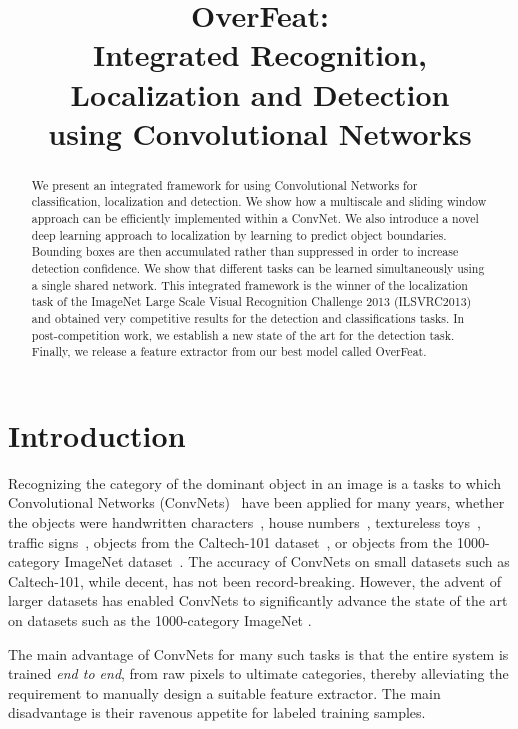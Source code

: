 \documentclass{article} %
\title{OverFeat:\\Integrated Recognition, Localization and Detection\\using Convolutional Networks}
\author{Pierre Sermanet
  \hskip 1em
  \textbf{David Eigen}\\
  \textbf{Xiang Zhang}
  \hskip 1em
  \textbf{Michael Mathieu}
  \hskip 1em
  \textbf{Rob Fergus}
  \hskip 1em
  \textbf{Yann LeCun}\\
Courant Institute of Mathematical Sciences, New York University\\
719 Broadway, 12th Floor, New York, NY 10003\\
\texttt{{sermanet,deigen,xiang,mathieu,fergus,yann}@cs.nyu.edu}
}
\begin{document}
\maketitle

\begin{abstract}
We present an integrated framework for using Convolutional Networks
for classification, localization and detection. We show how a
multiscale and sliding window approach can be efficiently
implemented within a ConvNet.
We also introduce a novel deep learning approach to localization
by learning to predict object boundaries. Bounding boxes are then
accumulated rather than suppressed in order to increase detection confidence.
We show that different tasks can be learned simultaneously using a single
shared network.
This integrated framework is the winner of the localization task of the
ImageNet Large Scale Visual Recognition Challenge 2013 (ILSVRC2013)
and obtained very competitive results for the detection and classifications
tasks. In post-competition work, we establish a new state of the art
for the detection task.
Finally, we release a feature extractor from our best model called OverFeat.
\end{abstract}

\section{Introduction}

Recognizing the category of the dominant object in an image is a tasks
to which Convolutional Networks (ConvNets)~\cite{lecun-98} have been
applied for many years, whether the objects were handwritten
characters~\cite{lecun-90c}, house numbers~\cite{sermanet-icpr-12}, textureless
toys~\cite{lecun-04}, traffic
signs~\cite{Ciresan12,sermanet-ijcnn-11}, objects from the
Caltech-101 dataset~\cite{jarrett-iccv-09}, or objects from the
1000-category ImageNet dataset~\cite{Kriz12}. The accuracy
of ConvNets on small datasets such as Caltech-101, while decent, has
not been record-breaking. However, the advent of larger datasets has
enabled ConvNets to significantly advance the state of the art on
datasets such as the 1000-category ImageNet \cite{imagenet}.

The main advantage of ConvNets for many such tasks is that the entire
system is trained {\em end to end}, from raw pixels to ultimate
categories, thereby alleviating the requirement to manually design a
suitable feature extractor. The main disadvantage is their ravenous
appetite for labeled training samples.
\end{document}
